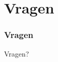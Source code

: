 
\section{Vragen}
\begin{frame}
	\frametitle{Vragen}
	\begin{center}
	\begin{huge}
		Vragen?
	\end{huge}
	\end{center}
\end{frame}
